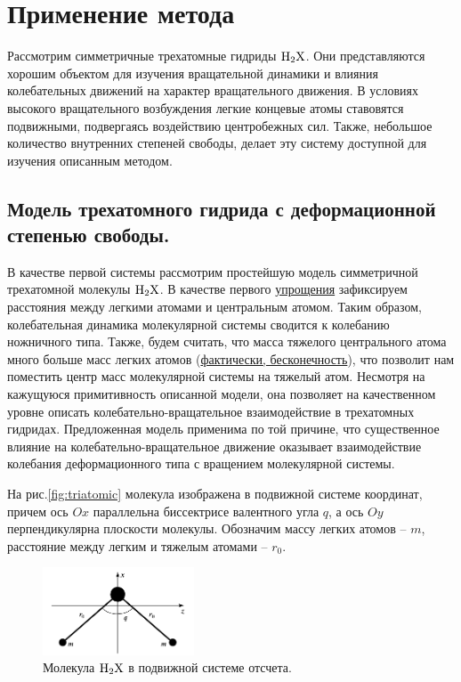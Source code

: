 \section{Применение метода}

Рассмотрим симметричные трехатомные гидриды $\ce{H2X}$. Они представляются хорошим объектом для изучения вращательной динамики и влияния колебательных движений на характер вращательного движения. В условиях высокого вращательного возбуждения легкие концевые атомы ставовятся подвижными, подвергаясь воздействию центробежных сил. Также, небольшое количество внутренних степеней свободы, делает эту систему доступной для изучения описанным методом. 

\subsection{Модель трехатомного гидрида с деформационной степенью свободы.}

В качестве первой системы рассмотрим простейшую модель симметричной трехатомной молекулы $\ce{H2X}$. В качестве первого \underline{упрощения} зафиксируем расстояния между легкими атомами и центральным атомом. Таким образом, колебательная динамика молекулярной системы сводится к колебанию ножничного типа. Также, будем считать, что масса тяжелого центрального атома много больше масс легких атомов (\underline{фактически, бесконечность}), что позволит нам поместить центр масс молекулярной системы на тяжелый атом. Несмотря на кажущуюся примитивность описанной модели, она позволяет на качественном уровне описать колебательно-вращательное взаимодействие в трехатомных гидридах. Предложенная модель применима по той причине, что существенное влияние на колебательно-вращательное движение оказывает взаимодействие колебания деформационного типа с вращением молекулярной системы.

На рис.\eqref{fig:triatomic} молекула изображена в подвижной системе координат, причем ось $Ox$ параллельна биссектрисе валентного угла $q$, а ось $Oy$ перпендикулярна плоскости молекулы. Обозначим массу легких атомов -- $m$, расстояние между легким и тяжелым атомами -- $r_0$. 

\begin{figure}[!ht]
  \centering
	\includegraphics[width=0.4\textwidth]{../pictures/triatomic_fixed.png}
	\caption{Молекула $\ce{H2X}$ в подвижной системе отсчета.}
	\label{fig:triatomic}
\end{figure}

